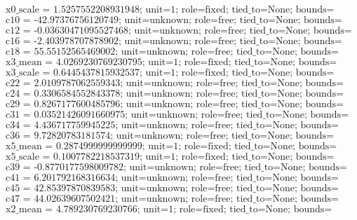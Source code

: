 \[\text{x0\_scale = 1.5257552208931948; unit=1; role=fixed; tied\_to=None; bounds=[None, None]; origin=train\_normalization}\]
\[\text{c10 = -42.97376756120749; unit=unknown; role=free; tied\_to=None; bounds=[None, None]; origin=native\_decimal\_coefficient}\]
\[\text{c12 = -0.03630471095527468; unit=unknown; role=free; tied\_to=None; bounds=[None, None]; origin=native\_decimal\_coefficient}\]
\[\text{c16 = -2.403978707878902; unit=unknown; role=free; tied\_to=None; bounds=[None, None]; origin=native\_decimal\_coefficient}\]
\[\text{c18 = 55.55152565469002; unit=unknown; role=free; tied\_to=None; bounds=[None, None]; origin=native\_decimal\_coefficient}\]
\[\text{x3\_mean = 4.0269230769230795; unit=1; role=fixed; tied\_to=None; bounds=[None, None]; origin=train\_normalization}\]
\[\text{x3\_scale = 0.6445437815932537; unit=1; role=fixed; tied\_to=None; bounds=[None, None]; origin=train\_normalization}\]
\[\text{c22 = 2.0109787062559343; unit=unknown; role=free; tied\_to=None; bounds=[None, None]; origin=native\_decimal\_coefficient}\]
\[\text{c24 = 0.3306584552843378; unit=unknown; role=free; tied\_to=None; bounds=[None, None]; origin=native\_decimal\_coefficient}\]
\[\text{c29 = 0.8267177600485796; unit=unknown; role=free; tied\_to=None; bounds=[None, None]; origin=native\_decimal\_coefficient}\]
\[\text{c31 = 0.03521426091660975; unit=unknown; role=free; tied\_to=None; bounds=[None, None]; origin=native\_decimal\_coefficient}\]
\[\text{c34 = 4.436717759945225; unit=unknown; role=free; tied\_to=None; bounds=[None, None]; origin=native\_decimal\_coefficient}\]
\[\text{c36 = 9.72820783181574; unit=unknown; role=free; tied\_to=None; bounds=[None, None]; origin=native\_decimal\_coefficient}\]
\[\text{x5\_mean = 0.2874999999999999; unit=1; role=fixed; tied\_to=None; bounds=[None, None]; origin=train\_normalization}\]
\[\text{x5\_scale = 0.1007782218537319; unit=1; role=fixed; tied\_to=None; bounds=[None, None]; origin=train\_normalization}\]
\[\text{c39 = -0.8770177598009782; unit=unknown; role=free; tied\_to=None; bounds=[None, None]; origin=native\_decimal\_coefficient}\]
\[\text{c41 = 6.201792168316634; unit=unknown; role=free; tied\_to=None; bounds=[None, None]; origin=native\_decimal\_coefficient}\]
\[\text{c45 = 42.85397870839583; unit=unknown; role=free; tied\_to=None; bounds=[None, None]; origin=native\_decimal\_coefficient}\]
\[\text{c47 = 44.02639607502421; unit=unknown; role=free; tied\_to=None; bounds=[None, None]; origin=native\_decimal\_coefficient}\]
\[\text{x2\_mean = 4.789230769230766; unit=1; role=fixed; tied\_to=None; bounds=[None, None]; origin=train\_normalization}\]
